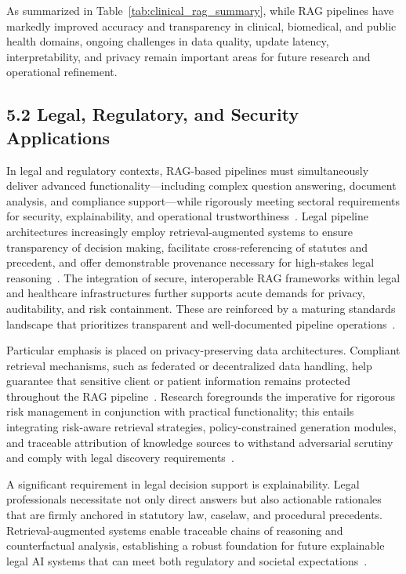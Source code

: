 \documentclass[11pt]{article}
\begin{document}
As summarized in Table~\ref{tab:clinical_rag_summary}, while RAG pipelines have markedly improved accuracy and transparency in clinical, biomedical, and public health domains, ongoing challenges in data quality, update latency, interpretability, and privacy remain important areas for future research and operational refinement.


\subsection{5.2 Legal, Regulatory, and Security Applications}

In legal and regulatory contexts, RAG-based pipelines must simultaneously deliver advanced functionality—including complex question answering, document analysis, and compliance support—while rigorously meeting sectoral requirements for security, explainability, and operational trustworthiness~\cite{ref63,ref64}. Legal pipeline architectures increasingly employ retrieval-augmented systems to ensure transparency of decision making, facilitate cross-referencing of statutes and precedent, and offer demonstrable provenance necessary for high-stakes legal reasoning~\cite{ref63}. The integration of secure, interoperable RAG frameworks within legal and healthcare infrastructures further supports acute demands for privacy, auditability, and risk containment. These are reinforced by a maturing standards landscape that prioritizes transparent and well-documented pipeline operations~\cite{ref63,ref64}.

Particular emphasis is placed on privacy-preserving data architectures. Compliant retrieval mechanisms, such as federated or decentralized data handling, help guarantee that sensitive client or patient information remains protected throughout the RAG pipeline~\cite{ref21,ref22,ref23,ref24,ref25,ref26,ref32,ref33,ref34,ref36,ref37,ref38,ref39,ref40,ref43,ref45,ref46,ref49,ref50,ref54,ref55,ref63}. Research foregrounds the imperative for rigorous risk management in conjunction with practical functionality; this entails integrating risk-aware retrieval strategies, policy-constrained generation modules, and traceable attribution of knowledge sources to withstand adversarial scrutiny and comply with legal discovery requirements~\cite{ref2,ref3,ref5,ref8,ref10,ref13,ref14,ref15,ref16,ref17,ref18,ref19,ref20,ref21,ref22,ref23,ref24,ref25,ref26,ref29,ref30,ref32,ref33,ref34,ref36,ref37,ref38,ref39,ref40,ref43,ref45,ref46,ref49,ref50,ref54,ref55,ref63}.

A significant requirement in legal decision support is explainability. Legal professionals necessitate not only direct answers but also actionable rationales that are firmly anchored in statutory law, caselaw, and procedural precedents. Retrieval-augmented systems enable traceable chains of reasoning and counterfactual analysis, establishing a robust foundation for future explainable legal AI systems that can meet both regulatory and societal expectations~\cite{ref63}.
\end{document}

